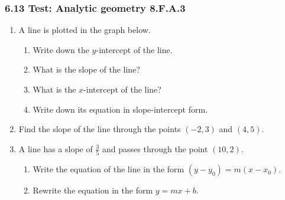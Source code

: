 

\fancyhead[LE]{\thepage}



\subsubsection*{6.13 Test: Analytic geometry \hfill 8.F.A.3}
\begin{enumerate}

\item A line is plotted in the graph below.
\begin{multicols}{2}
    \begin{enumerate}[itemsep=0.5cm]
      \item Write down the $y$-intercept of the line.
      \item What is the slope of the line?
      \item What is the $x$-intercept of the line?
      \item Write down its equation in slope-intercept form.
      \end{enumerate}
    \begin{flushright}
    \end{flushright}
  \end{multicols} \vspace{2cm}

\item Find the slope of the line through the points $(-2, 3)$ and $(4, 5)$. \vspace{3cm}

\item A line has a slope of $\displaystyle \frac{3}{5}$ and passes through the point $(10, 2)$. 
  \begin{enumerate}[itemsep=1cm]
      \item Write the equation of the line in the form $(y-y_0)=m(x-x_0)$.
      \item Rewrite the equation in the form $y=mx+b$. \vspace{4cm}
  \end{enumerate}


\end{enumerate}
